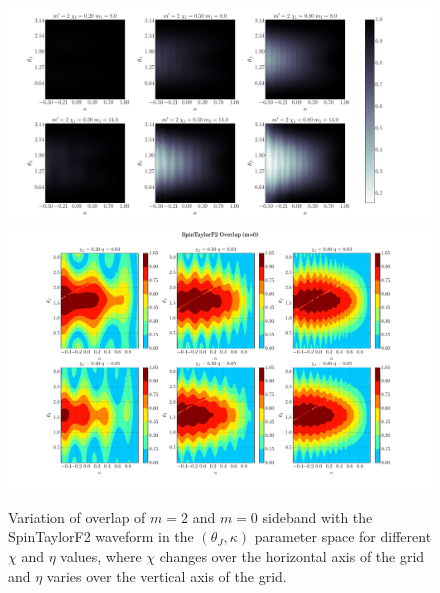 \label{fig:P2}  \begin{figure}[t]
\includegraphics[width=\textwidth]{./images/OVLP_GRID_P2.pdf}
\includegraphics[width=\textwidth]{./images/OVLP_GRID_P0.pdf} \caption{Variation
of overlap of $m=2$ and $m=0$ sideband with the SpinTaylorF2
waveform in the $(\theta_J, \kappa)$ parameter space for  different $\chi$ and
$\eta$ values, where $\chi$ changes over the horizontal  axis of the grid and
$\eta$ varies over the vertical axis of the grid.}  
\centering  
\end{figure}
